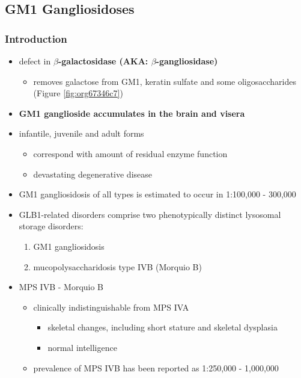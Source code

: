 \documentclass[12pt]{scrartcl}
\begin{document}
\subsection{GM1 Gangliosidoses}
\label{sec:org3b466a5}
\subsubsection{Introduction}
\label{sec:org167671e}
\begin{itemize}
\item defect in \textbf{\(\beta\)-galactosidase (AKA: \(\beta\)-gangliosidase)}
\begin{itemize}
\item removes galactose from GM1, keratin sulfate and some oligosaccharides (Figure \ref{fig:org67346c7})
\end{itemize}
\item \textbf{GM1 ganglioside accumulates in the brain and visera}
\item infantile, juvenile and adult forms
\begin{itemize}
\item correspond with amount of residual enzyme function
\item devastating degenerative disease
\end{itemize}
\item GM1 gangliosidosis of all types is estimated to occur in 1:100,000 - 300,000
\item GLB1-related disorders comprise two phenotypically distinct lysosomal storage disorders:
\begin{enumerate}
\item GM1 gangliosidosis
\item mucopolysaccharidosis type IVB (Morquio B)
\end{enumerate}
\item MPS IVB - Morquio B
\begin{itemize}
\item clinically indistinguishable from MPS IVA 
\begin{itemize}
\item skeletal changes, including short stature and skeletal dysplasia
\item normal intelligence
\end{itemize}
\item prevalence of MPS IVB has been reported as 1:250,000 - 1,000,000
\end{itemize}
\end{itemize}
\end{document}
